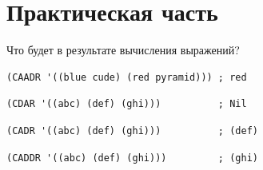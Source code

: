 \documentclass[a4paper]{report}
\begin{document}


\section*{Практическая часть}

\begin{task}
	Что будет в результате вычисления выражений?
	\begin{AutoMultiColEnumerate}
		\item
\begin{lstlisting}[style=lispinline]
(CAADR '((blue cude) (red pyramid))) ; red
\end{lstlisting}

		\item
\begin{lstlisting}[style=lispinline]
(CDAR '((abc) (def) (ghi)))          ; Nil
\end{lstlisting}

		\item
\begin{lstlisting}[style=lispinline]
(CADR '((abc) (def) (ghi)))          ; (def)
\end{lstlisting}

		\item
\begin{lstlisting}[style=lispinline]
(CADDR '((abc) (def) (ghi)))         ; (ghi)
\end{lstlisting}
	\end{AutoMultiColEnumerate}
\end{task}
\end{document}
